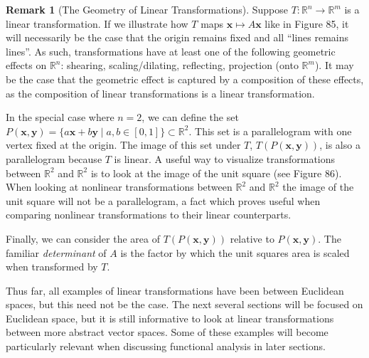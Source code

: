 \documentclass{article}
\newcommand{\R}{\mathbb{R}}
\newcommand{\x}{\mathbf{x}}
\newcommand{\y}{\mathbf{y}}
\theoremstyle{definition}
\newtheorem{remark}{Remark}[section]
\begin{document}
\begin{remark}[The Geometry of Linear Transformations]
	Suppose $ T:\R^n\to\R^m $ is a linear transformation. If we illustrate how $ T $ maps $ \x\mapsto A\x $ like in Figure 85, it will necessarily be the case that the origin remains fixed and all ``lines remains lines''. As such, transformations have at least one of the following geometric effects on $ \R^n $: shearing, scaling/dilating, reflecting, projection (onto $ \R^m $). It may be the case that the geometric effect is captured by a composition of these effects, as the composition of linear transformations is a linear transformation. 
	\begin{figure}[h!]
		\centering
		\caption{}
	\end{figure}

  In the special case where $ n=2 $, we can define the set $ P(\x,\y)=\{a\x+b\y \mid a,b\in[0,1]\}\subset \R^2 $. This set is a parallelogram with one vertex fixed at the origin. The image of this set under $ T $, $ T(P(\x,\y)) $, is also a parallelogram because $ T $ is linear. A useful way to visualize transformations between $ \R^2 $ and $ \R^2 $ is to look at the image of the unit square (see Figure 86). When looking at nonlinear transformations between $ \R^2 $ and $ \R^2 $ the image of the unit square will not be a parallelogram, a fact which proves useful when comparing nonlinear transformations to their linear counterparts.
  
  Finally, we can consider the area of $ T(P(\x,\y)) $ relative to $ P(\x,\y) $. The familiar \textit{\color{red}determinant} of $ A $ is the factor by which the unit squares area is scaled when transformed by $ T $.  
\end{remark}
Thus far, all examples of linear transformations have been between Euclidean spaces, but this need not be the case. The next several sections will be focused on Euclidean space, but it is still informative to look at linear transformations between more abstract vector spaces. Some of these examples will become particularly relevant when discussing functional analysis in later sections.
\end{document}
